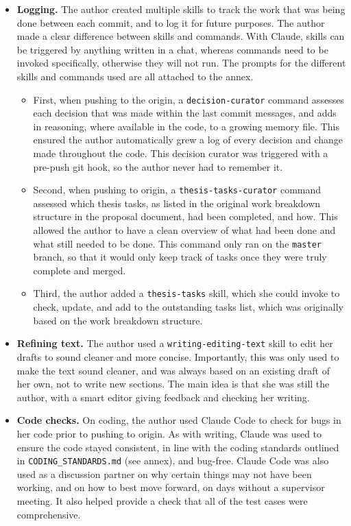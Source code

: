 \begin{itemize}
    \item \textbf{Logging.} The author created multiple skills to track the work
    that was being done between each commit, and to log it for future purposes.
    The author made a clear difference between skills and commands. With Claude,
    skills can be triggered by anything written in a chat, whereas commands need
    to be invoked specifically, otherwise they will not run. The prompts for the
    different skills and commands used are all attached to the annex.
    \begin{itemize}
        \item First, when pushing to the origin, a \texttt{decision-curator}
        command assesses each decision that was made within the last commit
        messages, and adds in reasoning, where available in the code, to a
        growing memory file. This ensured the author automatically grew a log of
        every decision and change made throughout the code. This decision
        curator was triggered with a pre-push git hook, so the author never had
        to remember it.
        \item Second, when pushing to origin, a \texttt{thesis-tasks-curator}
        command assessed which thesis tasks, as listed in the original work
        breakdown structure in the proposal document, had been completed, and
        how. This allowed the author to have a clean overview of what had been
        done and what still needed to be done. This command only ran on the
        \texttt{master} branch, so that it would only keep track of tasks once
        they were truly complete and merged.
        \item Third, the author added a \texttt{thesis-tasks} skill, which she
        could invoke to check, update, and add to the outstanding tasks list,
        which was originally based on the work breakdown structure.
    \end{itemize}

    \item \textbf{Refining text.} The author used a \texttt{writing-editing-text}
    skill to edit her drafts to sound cleaner and more concise. Importantly, this
    was only used to make the text sound cleaner, and was always based on an
    existing draft of her own, not to write new sections. The main idea is that
    she was still the author, with a smart editor giving feedback and checking
    her writing.

    \item \textbf{Code checks.} On coding, the author used Claude Code to check
    for bugs in her code prior to pushing to origin. As with writing, Claude was
    used to ensure the code stayed consistent, in line with the coding standards
    outlined in \texttt{CODING\_STANDARDS.md} (see annex), and bug-free. Claude
    Code was also used as a discussion partner on why certain things may not have
    been working, and on how to best move forward, on days without a supervisor
    meeting. It also helped provide a check that all of the test cases were
    comprehensive.


\end{itemize}
